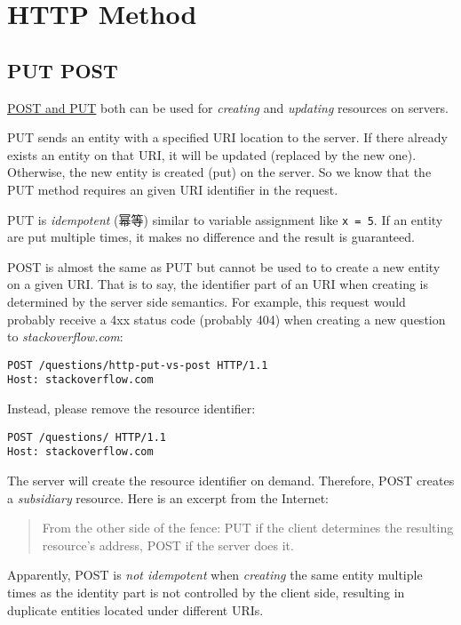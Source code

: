 \section{HTTP Method}
\label{sec:http-method}

\subsection{PUT POST}
\label{sec:put-post}

\href{https://stackoverflow.com/a/630475}{POST and PUT} both can
be used for \textit{creating} and \textit{updating} resources on
servers.

PUT sends an entity with a specified URI location to the
server. If there already exists an entity on that URI, it will be
updated (replaced by the new one). Otherwise, the new entity is
created (put) on the server. So we know that the PUT method
requires an given URI identifier in the request.

PUT is \textit{idempotent} (幂等) similar to variable assignment
like \verb|x = 5|. If an entity are put multiple times, it makes
no difference and the result is guaranteed.

POST is almost the same as PUT but cannot be used to to create a
new entity on a given URI. That is to say, the identifier part of
an URI when creating is determined by the server side
semantics. For example, this request would probably receive a 4xx
status code (probably 404) when creating a new question to
\textit{stackoverflow.com}:

\begin{lstlisting}
POST /questions/http-put-vs-post HTTP/1.1
Host: stackoverflow.com
\end{lstlisting}

Instead, please remove the resource identifier:

\begin{lstlisting}
POST /questions/ HTTP/1.1
Host: stackoverflow.com
\end{lstlisting}

The server will create the resource identifier on
demand. Therefore, POST creates a \textit{subsidiary}
resource. Here is an excerpt from the Internet:

\begin{quotation}
  From the other side of the fence: PUT if the client determines
  the resulting resource's address, POST if the server does it.
\end{quotation}

Apparently, POST is \textit{not idempotent} when \textit{creating}
the same entity multiple times as the identity part is not
controlled by the client side, resulting in duplicate entities
located under different URIs.

